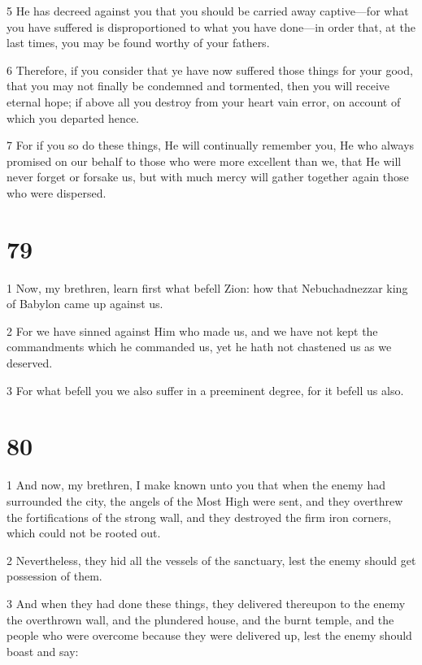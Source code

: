 \par 5 He has decreed against you that you should be carried away captive—for what you have suffered is disproportioned to what you have done—in order that, at the last times, you may be found worthy of your fathers. 

\par 6 Therefore, if you consider that ye have now suffered those things for your good, that you may not finally be condemned and tormented, then you will receive eternal hope; if above all you destroy from your heart vain error, on account of which you departed hence. 

\par 7 For if you so do these things, He will continually remember you, He who always promised on our behalf to those who were more excellent than we, that He will never forget or forsake us, but with much mercy will gather together again those who were dispersed.

\chapter{79}

\par 1 Now, my brethren, learn first what befell Zion: how that Nebuchadnezzar king of Babylon came up against us. 

\par 2 For we have sinned against Him who made us, and we have not kept the commandments which he commanded us, yet he hath not chastened us as we deserved. 

\par 3 For what befell you we also suffer in a preeminent degree, for it befell us also.

\chapter{80}

\par 1 And now, my brethren, I make known unto you that when the enemy had surrounded the city, the angels of the Most High were sent, and they overthrew the fortifications of the strong wall, and they destroyed the firm iron corners, which could not be rooted out. 

\par 2 Nevertheless, they hid all the vessels of the sanctuary, lest the enemy should get possession of them. 

\par 3 And when they had done these things, they delivered thereupon to the enemy the overthrown wall, and the plundered house, and the burnt temple, and the people who were overcome because they were delivered up, lest the enemy should boast and say: 

